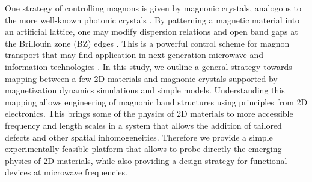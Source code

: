 \documentclass[aps,prx,twocolumn,superscriptaddress,floatfix]{revtex4-2}
\begin{document}
One strategy of controlling magnons is given by magnonic crystals, analogous to the more well-known photonic crystals \cite{krauss_two-dimensional_1996, joannopoulos_photonic_1997, nikitov_spin_2001}. By patterning a magnetic material into an artificial lattice, one may modify dispersion relations and open band gaps at the Brillouin zone (BZ) edges \cite{chumak_current-controlled_2009, wang_nanostructured_2010, tacchi_band_2011}. This is a powerful control scheme for magnon transport that may find application in next-generation microwave and information technologies \cite{chumak_magnonic_2017}. In this study, we outline a general strategy towards mapping between a few 2D materials and magnonic crystals supported by magnetization dynamics simulations and simple models. Understanding this mapping allows engineering of magnonic band structures using principles from 2D electronics. This brings some of the physics of 2D materials to more accessible frequency and length scales in a system that allows the addition of tailored defects and other spatial inhomogeneities.  Therefore we provide a simple experimentally feasible platform that allows to probe directly the emerging physics of 2D materials, while also providing a design strategy for functional devices at microwave frequencies.
\end{document}

